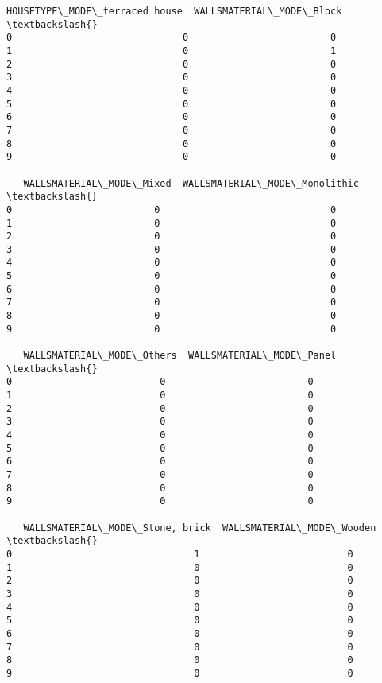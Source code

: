 \documentclass[11pt]{article}
\begin{document}
\begin{Verbatim}[commandchars=\\\{\}]
   HOUSETYPE\_MODE\_terraced house  WALLSMATERIAL\_MODE\_Block  \textbackslash{}
0                              0                         0   
1                              0                         1   
2                              0                         0   
3                              0                         0   
4                              0                         0   
5                              0                         0   
6                              0                         0   
7                              0                         0   
8                              0                         0   
9                              0                         0   

   WALLSMATERIAL\_MODE\_Mixed  WALLSMATERIAL\_MODE\_Monolithic  \textbackslash{}
0                         0                              0   
1                         0                              0   
2                         0                              0   
3                         0                              0   
4                         0                              0   
5                         0                              0   
6                         0                              0   
7                         0                              0   
8                         0                              0   
9                         0                              0   

   WALLSMATERIAL\_MODE\_Others  WALLSMATERIAL\_MODE\_Panel  \textbackslash{}
0                          0                         0   
1                          0                         0   
2                          0                         0   
3                          0                         0   
4                          0                         0   
5                          0                         0   
6                          0                         0   
7                          0                         0   
8                          0                         0   
9                          0                         0   

   WALLSMATERIAL\_MODE\_Stone, brick  WALLSMATERIAL\_MODE\_Wooden  \textbackslash{}
0                                1                          0   
1                                0                          0   
2                                0                          0   
3                                0                          0   
4                                0                          0   
5                                0                          0   
6                                0                          0   
7                                0                          0   
8                                0                          0   
9                                0                          0   


\end{Verbatim}
\end{document}
